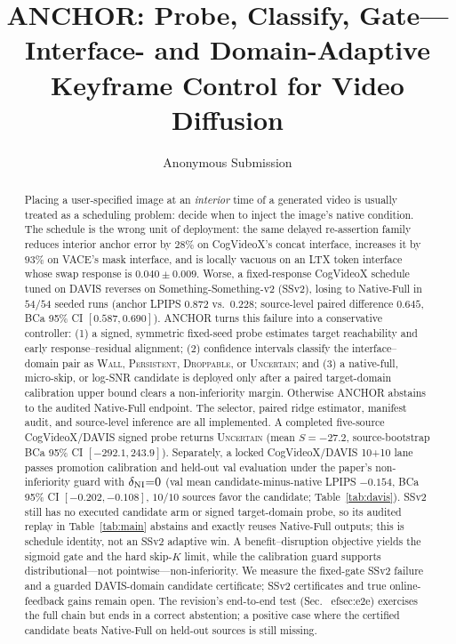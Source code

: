 \documentclass[letterpaper]{article}
\title{ANCHOR: Probe, Classify, Gate---\\
Interface- and Domain-Adaptive Keyframe Control for Video Diffusion}
\author{Anonymous Submission}
\begin{document}
\maketitle

\begin{abstract}
Placing a user-specified image at an \emph{interior} time of a generated
video is usually treated as a scheduling problem: decide when to inject
the image's native condition. The schedule is the wrong unit of deployment: the same delayed
re-assertion family reduces interior anchor error by $28\%$ on CogVideoX's
concat interface, increases it by $93\%$ on VACE's mask interface, and is
locally vacuous on an LTX token interface whose swap response is
$0.040{\pm}0.009$. Worse, a fixed-response CogVideoX schedule tuned on DAVIS reverses on
Something-Something-v2 (SSv2), losing to
Native-Full in $54/54$ seeded runs (anchor LPIPS $0.872$ vs.\ $0.228$;
source-level paired difference $0.645$, BCa 95\% CI $[0.587,0.690]$).
ANCHOR turns this failure into a conservative controller: (1) a signed,
symmetric fixed-seed probe estimates target reachability and early
response--residual alignment; (2) confidence intervals classify the
interface--domain pair as \textsc{Wall}, \textsc{Persistent},
\textsc{Droppable}, or \textsc{Uncertain}; and (3) a native-full,
micro-skip, or log-SNR candidate is deployed only after a paired
target-domain calibration upper bound clears a non-inferiority margin.
Otherwise ANCHOR abstains to the audited Native-Full endpoint. The selector,
paired ridge estimator, manifest audit, and source-level inference are all
implemented. A completed five-source CogVideoX/DAVIS signed probe returns
\textsc{Uncertain} (mean $S=-27.2$, source-bootstrap BCa 95\% CI
$[-292.1,243.9]$). Separately, a locked CogVideoX/DAVIS 10{+}10 lane
passes promotion calibration and held-out val evaluation under the
paper's non-inferiority guard with $\delta_{\rm NI}{=}0$ (val mean
candidate-minus-native LPIPS $-0.154$, BCa 95\% CI
$[-0.202,-0.108]$, $10/10$ sources favor the candidate;
Table~\ref{tab:davis}).
SSv2 still has no executed candidate arm or signed target-domain probe, so
its audited replay in Table~\ref{tab:main} abstains and exactly reuses
Native-Full outputs; this is schedule identity, not an SSv2 adaptive win.
A benefit--disruption objective yields the sigmoid gate and the hard
skip-$K$ limit, while the calibration guard supports distributional---not
pointwise---non-inferiority. We measure the fixed-gate SSv2 failure and a
guarded DAVIS-domain candidate certificate; SSv2 certificates and true
online-feedback gains remain open. The revision's end-to-end test
(Sec.~
ef{sec:e2e}) exercises the full chain but ends in a correct
abstention; a positive case where the certified candidate beats
Native-Full on held-out sources is still missing.
\end{abstract}
\end{document}
